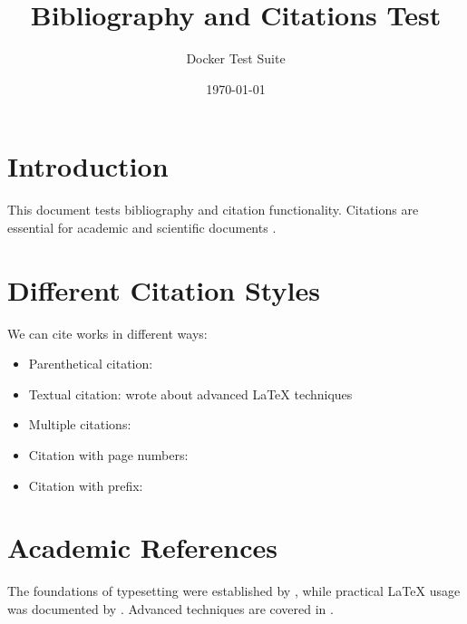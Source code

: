 \documentclass{article}
\title{Bibliography and Citations Test}
\author{Docker Test Suite}
\date{\today}
\begin{document}
\maketitle

\section{Introduction}
This document tests bibliography and citation functionality. Citations are essential for academic and scientific documents \citep{knuth1984texbook}.

\section{Different Citation Styles}
We can cite works in different ways:
\begin{itemize}
    \item Parenthetical citation: \citep{lamport1994latex}
    \item Textual citation: \citet{goossens1993latex} wrote about advanced LaTeX techniques
    \item Multiple citations: \citep{knuth1984texbook, lamport1994latex, goossens1993latex}
    \item Citation with page numbers: \citep[p.~123]{knuth1984texbook}
    \item Citation with prefix: \citep[see][]{lamport1994latex}
\end{itemize}

\section{Academic References}
The foundations of typesetting were established by \citet{knuth1984texbook}, while practical LaTeX usage was documented by \citet{lamport1994latex}. Advanced techniques are covered in \citet{goossens1993latex}.
\end{document}
